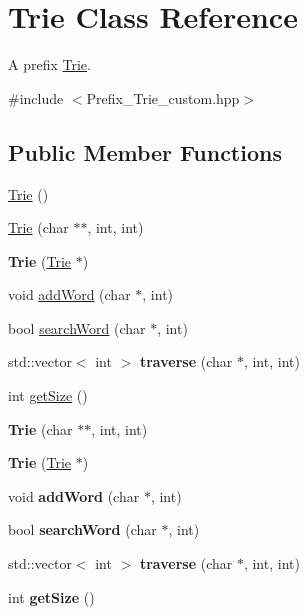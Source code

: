 \hypertarget{class_trie}{}\section{Trie Class Reference}
\label{class_trie}


A prefix \hyperlink{class_trie}{Trie}.  




{\ttfamily \#include $<$Prefix\+\_\+\+Trie\+\_\+custom.\+hpp$>$}

\subsection*{Public Member Functions}
\begin{DoxyCompactItemize}
\item 
\hyperlink{class_trie_a6af57e9f25d0d0a2d59eea5a4a802908}{Trie} ()
\item 
\hyperlink{class_trie_a5168ff08df4d3dd0255c24167bfdc563}{Trie} (char $\ast$$\ast$, int, int)
\item 
\mbox{\label{class_trie_a7d757164056d7e42833fa06807b4b957}} 
{\bfseries Trie} (\hyperlink{class_trie}{Trie} $\ast$)
\item 
void \hyperlink{class_trie_ad793716c7d7e99240d6b3fa5fd1a4ff8}{add\+Word} (char $\ast$, int)
\item 
bool \hyperlink{class_trie_a3760a51720b288a6628360008977de6f}{search\+Word} (char $\ast$, int)
\item 
\mbox{\label{class_trie_ab69ae6a49b6346bf0cdc2589e388a179}} 
std\+::vector$<$ int $>$ {\bfseries traverse} (char $\ast$, int, int)
\item 
int \hyperlink{class_trie_aaf9bd72bfad7fa2ecfe47b7a69c05c51}{get\+Size} ()
\item 
\mbox{\label{class_trie_a5168ff08df4d3dd0255c24167bfdc563}} 
{\bfseries Trie} (char $\ast$$\ast$, int, int)
\item 
\mbox{\label{class_trie_a7d757164056d7e42833fa06807b4b957}} 
{\bfseries Trie} (\hyperlink{class_trie}{Trie} $\ast$)
\item 
\mbox{\label{class_trie_ad793716c7d7e99240d6b3fa5fd1a4ff8}} 
void {\bfseries add\+Word} (char $\ast$, int)
\item 
\mbox{\label{class_trie_a3760a51720b288a6628360008977de6f}} 
bool {\bfseries search\+Word} (char $\ast$, int)
\item 
\mbox{\label{class_trie_a7762c170d018ac4fab93a1bacf9f29aa}} 
std\+::vector$<$ int $>$ {\bfseries traverse} (char $\ast$, int, int)
\item 
\mbox{\label{class_trie_aaf9bd72bfad7fa2ecfe47b7a69c05c51}} 
int {\bfseries get\+Size} ()
\end{DoxyCompactItemize}


